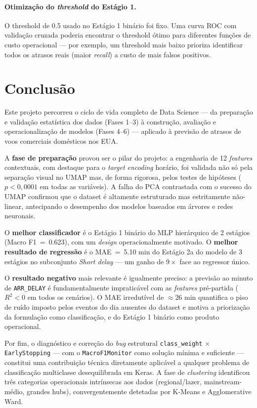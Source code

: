 \documentclass[conference]{IEEEtran}
\begin{document}
\paragraph{Otimização do \textit{threshold} do Estágio 1.}
O threshold de 0.5 usado no Estágio 1 binário foi fixo. Uma curva ROC com
validação cruzada poderia encontrar o threshold ótimo para diferentes funções
de custo operacional — por exemplo, um threshold mais baixo prioriza
identificar todos os atrasos reais (maior \textit{recall}) a custo de mais
falsos positivos.

\section{Conclusão}
Este projeto percorreu o ciclo de vida completo de Data Science — da preparação
e validação estatística dos dados (Fases 1–3) à construção, avaliação e
operacionalização de modelos (Fases 4–6) — aplicado à previsão de atrasos de
voos comerciais domésticos nos EUA.

A \textbf{fase de preparação} provou ser o pilar do projeto: a engenharia de 12
\textit{features} contextuais, com destaque para o \textit{target encoding}
horário, foi validada não só pela separação visual no UMAP mas, de forma
rigorosa, pelos testes de hipóteses ($p<0{,}0001$ em todas as variáveis). A
falha do PCA contrastada com o sucesso do UMAP confirmou que o dataset é
altamente estruturado mas estritamente não-linear, antecipando o desempenho dos
modelos baseados em árvores e redes neuronais.

O \textbf{melhor classificador} é o Estágio 1 binário do MLP hierárquico de 2
estágios (Macro F1~=~0.623), com um \textit{design} operacionalmente motivado.
O \textbf{melhor resultado de regressão} é o MAE~=~5.10 min do Estágio 2a do
modelo de 3 estágios no subconjunto \textit{Short delay} — um ganho de
$9\times$ face ao regressor único.

O \textbf{resultado negativo} mais relevante é igualmente preciso: a previsão
ao minuto de \texttt{ARR\_DELAY} é fundamentalmente impraticável com as
\textit{features} pré-partida ($R^2 < 0$ em todos os cenários). O MAE
irredutível de $\approx$26 min quantifica o piso de ruído imposto pelos eventos
do dia ausentes do dataset e motiva a priorização da formulação como
classificação, e do Estágio 1 binário como produto operacional.

Por fim, o diagnóstico e correção do \textit{bug} estrutural
\texttt{class\_weight} $\times$ \texttt{EarlyStopping} — com o
\texttt{MacroF1Monitor} como solução mínima e suficiente — constitui uma
contribuição técnica diretamente aplicável a qualquer problema de classificação
multiclasse desequilibrada em Keras. A fase de \textit{clustering} identificou
três categorias operacionais intrínsecas aos dados (regional/lazer,
mainstream-médio, grandes hubs), convergentemente detetadas por K-Means e
Agglomerative Ward.
\end{document}
